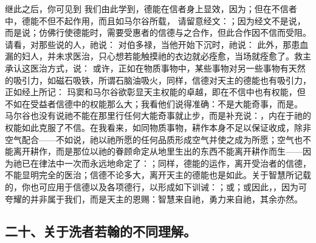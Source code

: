 继此之后，你可见到 我们由此学到，德能在信者身上显效，因为；但在不信者中，德能不但不起作用，而且如马尔谷所载， 请留意经文：；因为经文不是说，而是说；仿佛行使德能时，需要受惠者的信德与之合作，但此合作因不信而受阻。请看，对那些说的人，祂说： 对伯多禄，当他开始下沉时，祂说： 此外，那患血漏的妇人，并未求医治，只心想若能触摸祂的衣边就必痊愈，当场就痊愈了。救主承认这医治方式，说： 或许，正如在物质事物中，某些事物对另一些事物有天然的吸引力，如磁石吸铁，所谓石脑油吸火，同样，信德对天主的德能也有吸引力，正如经上所记： 玛窦和马尔谷欲彰显天主权能的卓越，即在不信中也有权能，但不如在受益者信德中的权能那么大；我看他们说得准确：不是大能奇事，而是。 马尔谷也没有说祂不能在那里行任何大能奇事就止步，而是补充说：，内在于祂的权能如此克服了不信。在我看来，如同物质事物，耕作本身不足以保证收成，除非空气配合——不如说，祂以祂所愿的任何品质形成空气并使之成为所愿；空气也不能离开耕作，而是那位以祂的眷顾命定从地里生出的东西不能离开耕作而生——因为祂已在律法中一次而永远地命定了：；同样，德能的运作，离开受治者的信德，不能显明完全的医治；信德不论多大，离开天主的德能也是如此。关于智慧所记载的，你也可应用于信德以及各项德行，以形成如下训诫：；或；或因此，，因为可夸耀的并非属于我们，而是天主的恩赐：智慧来自祂，勇力来自祂，其余亦然。\par


\subsection{二十、关于洗者若翰的不同理解。}

